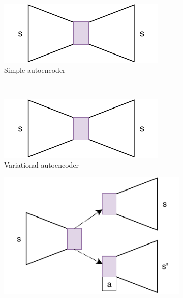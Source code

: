 \begin{figure}[ht!]
	\centering
	\begin{subfigure}{0.45\columnwidth}
		\centering
		\includegraphics[width=\linewidth]{../img/very_simple_autoencoder.pdf}
		\caption{Simple autoencoder}
		\label{subfig:repr_learner_simple_autoencoder}
	\end{subfigure}%
	~ 
	\begin{subfigure}{0.45\columnwidth}
		\centering
		\includegraphics[width=\linewidth]{../img/very_simple_autoencoder.pdf}
		\caption{Variational autoencoder}
		\label{subfig:repr_learner_vae}
	\end{subfigure}
	\begin{subfigure}{0.5\columnwidth}
		\centering
		\includegraphics[width=\linewidth]{../img/janus.pdf}

\end{subfigure}
\end{figure}

